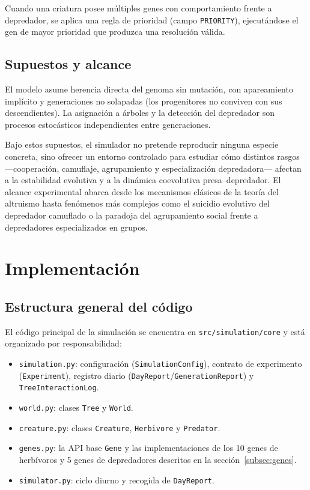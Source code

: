 \documentclass[11pt,a4paper]{article}
\begin{document}
Cuando una criatura posee m\'ultiples genes con comportamiento frente a depredador, se aplica una regla
de prioridad (campo \texttt{PRIORITY}), ejecut\'andose el gen de mayor prioridad que produzca una
resoluci\'on v\'alida.

\subsection{Supuestos y alcance}

El modelo asume herencia directa del genoma sin mutaci\'on, con apareamiento impl\'icito y generaciones
no solapadas (los progenitores no conviven con sus descendientes). La asignaci\'on a \'arboles y la
detecci\'on del depredador son procesos estoc\'asticos independientes entre generaciones.

Bajo estos supuestos, el simulador no pretende reproducir ninguna especie concreta, sino ofrecer un entorno
controlado para estudiar c\'omo distintos rasgos ---cooperaci\'on, camuflaje, agrupamiento y especializaci\'on
depredadora--- afectan a la estabilidad evolutiva y a la din\'amica coevolutiva presa--depredador.
El alcance experimental abarca desde los mecanismos cl\'asicos de la teor\'ia del altruismo hasta fen\'omenos
m\'as complejos como el suicidio evolutivo del depredador camuflado o la paradoja del agrupamiento social
frente a depredadores especializados en grupos.

\section{Implementaci\'on}
\subsection{Estructura general del c\'odigo}

El c\'odigo principal de la simulaci\'on se encuentra en \texttt{src/simulation/core} y est\'a organizado por responsabilidad:

\begin{sloppypar}
\begin{itemize}
	\item \texttt{simulation.py}: configuraci\'on (\texttt{SimulationConfig}), contrato de experimento
	(\texttt{Experiment}), registro diario (\texttt{DayReport}/\texttt{GenerationReport}) y \texttt{TreeInteractionLog}.
	\item \texttt{world.py}: clases \texttt{Tree} y \texttt{World}.
	\item \texttt{creature.py}: clases \texttt{Creature}, \texttt{Herbivore} y \texttt{Predator}.
	\item \texttt{genes.py}: la API base \texttt{Gene} y las implementaciones de los 10 genes
	de herb\'ivoros y 5 genes de depredadores descritos en la
	secci\'on~\ref{subsec:genes}.
	\item \texttt{simulator.py}: ciclo diurno y recogida de \texttt{DayReport}.
\end{itemize}
\end{sloppypar}
\end{document}
